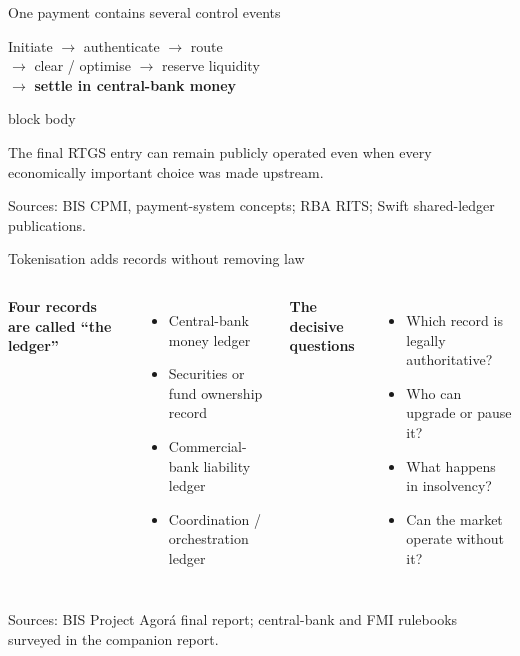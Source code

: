 \documentclass[aspectratio=169,12pt]{beamer}
\newcommand{\rust}[1]{\textcolor{Rust}{\textbf{#1}}}
\newcommand{\blue}[1]{\textcolor{Ocean}{\textbf{#1}}}
\newcommand{\source}[1]{\vfill\par\fontsize{5.4}{6.5}\selectfont\color{Quiet}Sources: #1}
\newcommand{\tightitems}{\setlength{\itemsep}{0.42em}\setlength{\parskip}{0pt}}
\newenvironment{statement}{%
  \begin{beamercolorbox}[sep=.18cm,rounded=false,wd=\linewidth]{block body}%
  \fontsize{13}{15.5}\selectfont\bfseries
}{\end{beamercolorbox}}
\begin{document}
\begin{frame}{One payment contains several control events} %
  \vspace{0.18cm}
  \begin{center}
    \fontsize{12}{14.5}\selectfont
    Initiate \quad $\rightarrow$ \quad authenticate \quad $\rightarrow$ \quad route \\
    \vspace{0.25cm}
    $\rightarrow$ \quad clear / optimise \quad $\rightarrow$ \quad reserve liquidity \\
    \vspace{0.25cm}
    $\rightarrow$ \quad \rust{settle in central-bank money}
  \end{center}
  \vspace{0.36cm}
  \begin{statement}
    The final RTGS entry can remain publicly operated even when every economically important choice was made upstream.
  \end{statement}
  \source{BIS CPMI, payment-system concepts; RBA RITS; Swift shared-ledger publications.}
\end{frame}

\begin{frame}{Tokenisation adds records without removing law}
  \begin{columns}[T,onlytextwidth]
      \rust{Four records are called ``the ledger''}
      \begin{itemize}\tightitems
        \item Central-bank money ledger
        \item Securities or fund ownership record
        \item Commercial-bank liability ledger
        \item Coordination / orchestration ledger
      \end{itemize}
      \blue{The decisive questions}
      \begin{itemize}\tightitems
        \item Which record is legally authoritative?
        \item Who can upgrade or pause it?
        \item What happens in insolvency?
        \item Can the market operate without it?
      \end{itemize}
  \end{columns}
  \source{BIS Project Agor\'a final report; central-bank and FMI rulebooks surveyed in the companion report.}
\end{frame}
\end{document}
